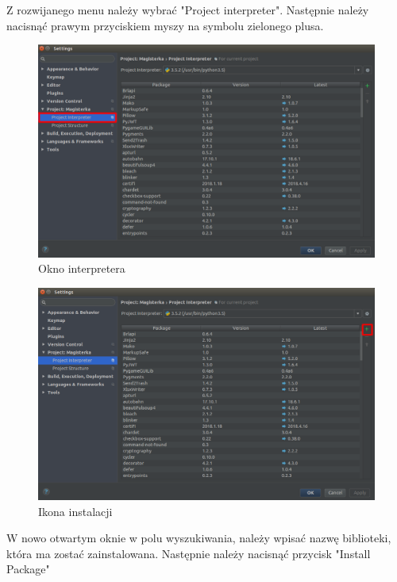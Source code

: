Z rozwijanego menu należy wybrać "Project interpreter". Następnie należy nacisnąć prawym przyciskiem myszy na symbolu zielonego plusa.

\begin{figure}[h]
\centering
\includegraphics[width=13cm]{Zdjecia/5/kasia/settings3}
\caption{Okno interpretera}
\label{fig:file}
\end{figure}

\begin{figure}[h]
\centering
\includegraphics[width=13cm]{Zdjecia/5/kasia/settings4}
\caption{Ikona instalacji}
\label{fig:file}
\end{figure}

W nowo otwartym oknie w polu wyszukiwania, należy wpisać nazwę biblioteki, która ma zostać zainstalowana. Następnie należy nacisnąć przycisk "Install Package"

